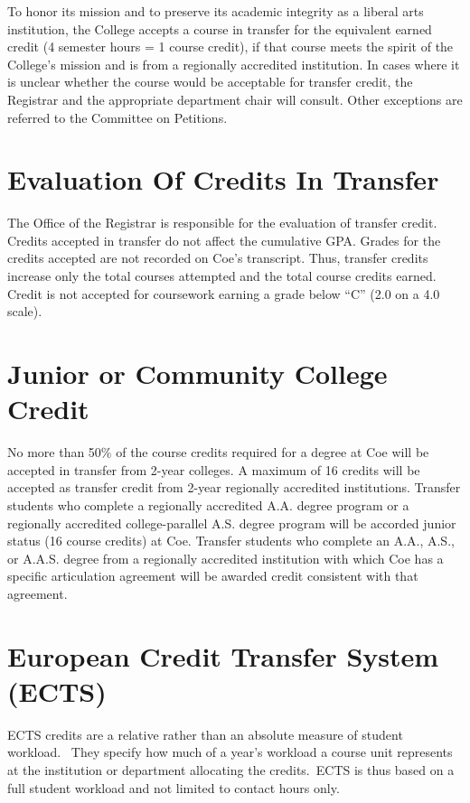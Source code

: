\documentclass[
  letterpaper,
]{scrbook}
\begin{document}
To honor its mission and to preserve its academic integrity as a liberal
arts institution, the College accepts a course in transfer for the
equivalent earned credit (4 semester hours = 1 course credit), if that
course meets the spirit of the College's mission and is from a
regionally accredited institution. In cases where it is unclear whether
the course would be acceptable for transfer credit, the Registrar and
the appropriate department chair will consult. Other exceptions are
referred to the Committee on Petitions.

\section{Evaluation Of Credits In
Transfer}\label{evaluation-of-credits-in-transfer}

The Office of the Registrar is responsible for the evaluation of
transfer credit. Credits accepted in transfer do not affect the
cumulative GPA. Grades for the credits accepted are not recorded on
Coe's transcript. Thus, transfer credits increase only the total courses
attempted and the total course credits earned. Credit is not accepted
for coursework earning a grade below ``C'' (2.0 on a 4.0 scale).

\section{Junior or Community College
Credit}\label{junior-or-community-college-credit}

No more than 50\% of the course credits required for a degree at Coe
will be accepted in transfer from 2-year colleges. A maximum of 16
credits will be accepted as transfer credit from 2-year regionally
accredited institutions. Transfer students who complete a regionally
accredited A.A. degree program or a regionally accredited
college-parallel A.S. degree program will be accorded junior status (16
course credits) at Coe. Transfer students who complete an A.A., A.S., or
A.A.S. degree from a regionally accredited institution with which Coe
has a specific articulation agreement will be awarded credit consistent
with that agreement.

\section{European Credit Transfer System
(ECTS)}\label{european-credit-transfer-system-ects}

ECTS credits are a relative rather than an absolute measure of student
workload.~ They specify how much of a year's workload a course unit
represents at the institution or department allocating the credits.~ECTS
is thus based on a full student workload and not limited to contact
hours only.
\end{document}
